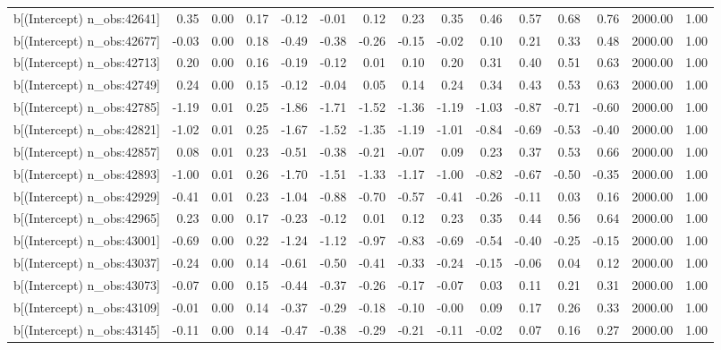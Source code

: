 \begin{table}[ht]
\begin{tabular}{rrrrrrrrrrrrrrr}
  b[(Intercept) n\_obs:42641] & 0.35 & 0.00 & 0.17 & -0.12 & -0.01 & 0.12 & 0.23 & 0.35 & 0.46 & 0.57 & 0.68 & 0.76 & 2000.00 & 1.00 \\ 
  b[(Intercept) n\_obs:42677] & -0.03 & 0.00 & 0.18 & -0.49 & -0.38 & -0.26 & -0.15 & -0.02 & 0.10 & 0.21 & 0.33 & 0.48 & 2000.00 & 1.00 \\ 
  b[(Intercept) n\_obs:42713] & 0.20 & 0.00 & 0.16 & -0.19 & -0.12 & 0.01 & 0.10 & 0.20 & 0.31 & 0.40 & 0.51 & 0.63 & 2000.00 & 1.00 \\ 
  b[(Intercept) n\_obs:42749] & 0.24 & 0.00 & 0.15 & -0.12 & -0.04 & 0.05 & 0.14 & 0.24 & 0.34 & 0.43 & 0.53 & 0.63 & 2000.00 & 1.00 \\ 
  b[(Intercept) n\_obs:42785] & -1.19 & 0.01 & 0.25 & -1.86 & -1.71 & -1.52 & -1.36 & -1.19 & -1.03 & -0.87 & -0.71 & -0.60 & 2000.00 & 1.00 \\ 
  b[(Intercept) n\_obs:42821] & -1.02 & 0.01 & 0.25 & -1.67 & -1.52 & -1.35 & -1.19 & -1.01 & -0.84 & -0.69 & -0.53 & -0.40 & 2000.00 & 1.00 \\ 
  b[(Intercept) n\_obs:42857] & 0.08 & 0.01 & 0.23 & -0.51 & -0.38 & -0.21 & -0.07 & 0.09 & 0.23 & 0.37 & 0.53 & 0.66 & 2000.00 & 1.00 \\ 
  b[(Intercept) n\_obs:42893] & -1.00 & 0.01 & 0.26 & -1.70 & -1.51 & -1.33 & -1.17 & -1.00 & -0.82 & -0.67 & -0.50 & -0.35 & 2000.00 & 1.00 \\ 
  b[(Intercept) n\_obs:42929] & -0.41 & 0.01 & 0.23 & -1.04 & -0.88 & -0.70 & -0.57 & -0.41 & -0.26 & -0.11 & 0.03 & 0.16 & 2000.00 & 1.00 \\ 
  b[(Intercept) n\_obs:42965] & 0.23 & 0.00 & 0.17 & -0.23 & -0.12 & 0.01 & 0.12 & 0.23 & 0.35 & 0.44 & 0.56 & 0.64 & 2000.00 & 1.00 \\ 
  b[(Intercept) n\_obs:43001] & -0.69 & 0.00 & 0.22 & -1.24 & -1.12 & -0.97 & -0.83 & -0.69 & -0.54 & -0.40 & -0.25 & -0.15 & 2000.00 & 1.00 \\ 
  b[(Intercept) n\_obs:43037] & -0.24 & 0.00 & 0.14 & -0.61 & -0.50 & -0.41 & -0.33 & -0.24 & -0.15 & -0.06 & 0.04 & 0.12 & 2000.00 & 1.00 \\ 
  b[(Intercept) n\_obs:43073] & -0.07 & 0.00 & 0.15 & -0.44 & -0.37 & -0.26 & -0.17 & -0.07 & 0.03 & 0.11 & 0.21 & 0.31 & 2000.00 & 1.00 \\ 
  b[(Intercept) n\_obs:43109] & -0.01 & 0.00 & 0.14 & -0.37 & -0.29 & -0.18 & -0.10 & -0.00 & 0.09 & 0.17 & 0.26 & 0.33 & 2000.00 & 1.00 \\ 
  b[(Intercept) n\_obs:43145] & -0.11 & 0.00 & 0.14 & -0.47 & -0.38 & -0.29 & -0.21 & -0.11 & -0.02 & 0.07 & 0.16 & 0.27 & 2000.00 & 1.00 \\ 

\end{tabular}
\end{table}
